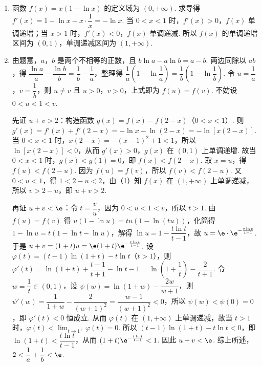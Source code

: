 \begin{solution}
\begin{enumerate}
    \item 函数 \(f(x)=x(1-\ln x)\) 的定义域为 \((0,+\infty)\). 求导得 \(f'(x)=1-\ln x-x\cdot\dfrac1x=-\ln x\). 当 \(0<x<1\) 时，\(f'(x)>0\)，\(f(x)\) 单调递增；当 \(x>1\) 时，\(f'(x)<0\)，\(f(x)\) 单调递减. 所以 \(f(x)\) 的单调递增区间为 \((0,1)\)，单调递减区间为 \((1,+\infty)\).
    \item 由题意，\(a\)，\(b\) 是两个不相等的正数，且 \(b\ln a-a\ln b=a-b\). 两边同除以 \(ab\)，得 \(\dfrac{\ln a}{a}-\dfrac{\ln b}{b}=\dfrac1b-\dfrac1a\)，整理得 \(\dfrac1a\left(1-\ln\dfrac1a\right)=\dfrac1b\left(1-\ln\dfrac1b\right)\). 令 \(u=\dfrac1a\)，\(v=\dfrac1b\)，则 \(u\ne v\) 且 \(u>0\)，\(v>0\)，上式即为 \(f(u)=f(v)\). 不妨设 \(0<u<1<v\).

    先证 \(u+v>2\)：构造函数 \(g(x)=f(x)-f(2-x)\)（\(0<x<1\)）. 则 \(g'(x)=f'(x)+f'(2-x)=-\ln x-\ln(2-x)=-\ln[x(2-x)]\). 当 \(0<x<1\) 时，\(x(2-x)=-(x-1)^2+1<1\)，所以 \(\ln[x(2-x)]<0\)，从而 \(g'(x)>0\)，\(g(x)\) 在 \((0,1)\) 上单调递增. 故当 \(0<x<1\) 时，\(g(x)<g(1)=0\)，即 \(f(x)<f(2-x)\). 取 \(x=u\)，得 \(f(u)<f(2-u)\). 因为 \(f(u)=f(v)\)，所以 \(f(v)<f(2-u)\). 又 \(0<u<1\)，得 \(1<2-u<2\)，由（1）知 \(f(x)\) 在 \((1,+\infty)\) 上单调递减，所以 \(v>2-u\)，即 \(u+v>2\).

    再证 \(u+v<\e\)：令 \(t=\dfrac vu\)，因为 \(0<u<1<v\)，所以 \(t>1\). 由 \(f(u)=f(v)\) 得 \(u(1-\ln u)=tu(1-\ln(tu))\)，化简得 \(1-\ln u=t(1-\ln t-\ln u)\)，解得 \(\ln u=1-\dfrac{t\ln t}{t-1}\)，故 \(u=\e\cdot\e^{-\frac{t\ln t}{t-1}}\). 于是 \(u+v=(1+t)u=\e(1+t)\e^{-\frac{t\ln t}{t-1}}\). 设 \(\varphi(t)=(t-1)\ln(1+t)-t\ln t\)（\(t>1\)），则 \(\varphi'(t)=\ln(1+t)+\dfrac{t-1}{t+1}-\ln t-1=\ln\left(1+\dfrac1t\right)-\dfrac{2}{t+1}\). 令 \(w=\dfrac1t\in(0,1)\)，设 \(\psi(w)=\ln(1+w)-\dfrac{2w}{w+1}\)，则 \(\psi'(w)=\dfrac{1}{1+w}-\dfrac{2}{(w+1)^2}=\dfrac{w-1}{(w+1)^2}<0\)，所以 \(\psi(w)<\psi(0)=0\)，即 \(\varphi'(t)<0\) 恒成立. 从而 \(\varphi(t)\) 在 \((1,+\infty)\) 上单调递减，故当 \(t>1\) 时，\(\varphi(t)<\lim_{t\to1^+}\varphi(t)=0\). 所以 \((t-1)\ln(1+t)-t\ln t<0\)，即 \(\ln(1+t)<\dfrac{t\ln t}{t-1}\)，从而 \((1+t)\e^{-\frac{t\ln t}{t-1}}<1\). 因此 \(u+v<\e\). 综上所述，\(2<\dfrac1a+\dfrac1b<\e\).
\end{enumerate}
\end{solution}
